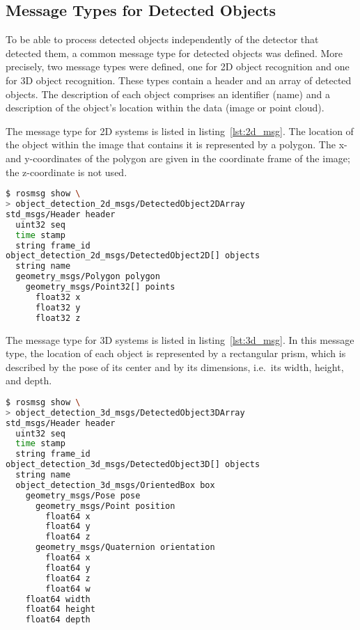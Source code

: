 \documentclass{article}
\newcommand{\code}[1]{\texttt{#1}}
\begin{document}
\subsection{Message Types for Detected Objects}
\label{sec:msg_types}

To be able to process detected objects independently of the detector that
detected them, a common message type for detected objects was defined.
More precisely, two message types were defined, one for 2D object recognition
and one for 3D object recognition.
These types contain a header and an array of detected objects. The description
of each object comprises an identifier (name) and a description of the
object's location within the data (image or point cloud).

The message type for 2D systems is listed in listing~\ref{lst:2d_msg}.
The location of the object within the image that contains it is represented
by a polygon. The x- and y-coordinates of the polygon are given in
the coordinate frame of the image; the z-coordinate is not used.
\begin{lstlisting}[language=bash,
caption={The \code{DetectedObject2DArray} message type},
label=lst:2d_msg]
$ rosmsg show \
> object_detection_2d_msgs/DetectedObject2DArray
std_msgs/Header header
  uint32 seq
  time stamp
  string frame_id
object_detection_2d_msgs/DetectedObject2D[] objects
  string name
  geometry_msgs/Polygon polygon
    geometry_msgs/Point32[] points
      float32 x
      float32 y
      float32 z
\end{lstlisting}	%

The message type for 3D systems is listed in listing~\ref{lst:3d_msg}.
In this message type, the location of each object is represented by
a rectangular prism, which is described by the pose of its center
and by its dimensions, i.e.\ its width, height, and depth.
\begin{lstlisting}[language=bash,
caption={The \code{DetectedObject3DArray} message type},
label=lst:3d_msg]
$ rosmsg show \
> object_detection_3d_msgs/DetectedObject3DArray
std_msgs/Header header
  uint32 seq
  time stamp
  string frame_id
object_detection_3d_msgs/DetectedObject3D[] objects
  string name
  object_detection_3d_msgs/OrientedBox box
    geometry_msgs/Pose pose
      geometry_msgs/Point position
        float64 x
        float64 y
        float64 z
      geometry_msgs/Quaternion orientation
        float64 x
        float64 y
        float64 z
        float64 w
    float64 width
    float64 height
    float64 depth
\end{lstlisting}	%
\end{document}
